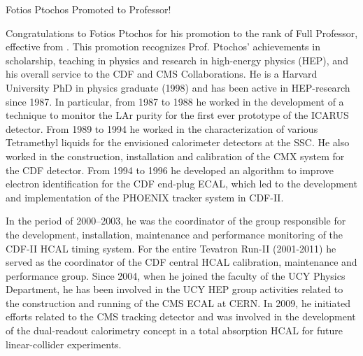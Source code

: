 \begin{headline}[enhanced, tikz={rotate=0}, width=0.48\textwidth]{Fotios Ptochos Promoted to Professor!}
  \begin{multicols}{3}
    Congratulations to Fotios Ptochos for his promotion to the rank of
    Full Professor, effective from \MyDate. This promotion recognizes
    Prof. Ptochos' achievements in scholarship, teaching in physics
    and research in high-energy physics (HEP), and his overall service
    to the CDF and CMS Collaborations. He is a Harvard University PhD
    in physics graduate (1998) and has been active in HEP-research
    since 1987. In particular, from 1987 to 1988 he worked in the
    development of a technique to monitor the LAr purity for the first
    ever prototype of the ICARUS detector. From 1989 to 1994 he worked
    in the characterization of various Tetramethyl liquids for the
    envisioned calorimeter detectors at the SSC. He also
    worked in the construction, installation and calibration of the
    CMX system for the CDF detector. From 1994 to 1996 he developed an algorithm to improve
    electron identification for the CDF end-plug ECAL, which led to
    the development and implementation of the PHOENIX tracker system
    in CDF-II.

    In the period of 2000–2003, he was the coordinator of the group
    responsible for the development, installation, maintenance and
    performance monitoring of the CDF-II HCAL timing system. For the entire Tevatron Run-II
    (2001-2011) he served as the coordinator of the CDF central HCAL
    calibration, maintenance and performance group. Since
    2004, when he joined the faculty of the UCY Physics Department, he has
    been involved in the UCY HEP group activities related to the
    construction and running of the CMS ECAL at CERN. In 2009, he
    initiated efforts related to the CMS tracking detector and was
    involved in the development of the dual-readout calorimetry
    concept in a total absorption HCAL for future linear-collider experiments. 


\end{multicols}
\end{headline}
